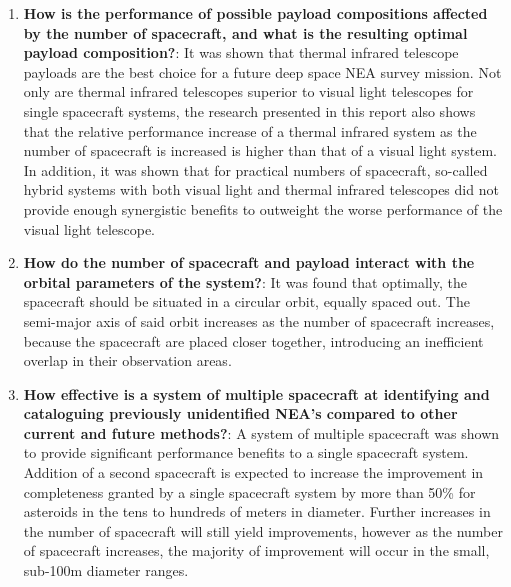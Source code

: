 \begin{enumerate}
 \item \textbf{How is the performance of possible payload compositions affected by the number of spacecraft, and what is the resulting optimal payload composition?}: It was shown that thermal infrared telescope payloads are the best choice for a future deep space NEA survey mission. Not only are thermal infrared telescopes superior to visual light telescopes for single spacecraft systems, the research presented in this report also shows that the relative performance increase of a thermal infrared system as the number of spacecraft is increased is higher than that of a visual light system. In addition, it was shown that for practical numbers of spacecraft, so-called hybrid systems with both visual light and thermal infrared telescopes did not provide enough synergistic benefits to outweight the worse performance of the visual light telescope.
 \item \textbf{How do the number of spacecraft and payload interact with the orbital parameters of the system?}: It was found that optimally, the spacecraft should be situated in a circular orbit, equally spaced out. The semi-major axis of said orbit increases as the number of spacecraft increases, because the spacecraft are placed closer together, introducing an inefficient overlap in their observation areas.
 \item \textbf{How effective is a system of multiple spacecraft at identifying and cataloguing previously unidentified NEA's compared to other current and future methods?}: A system of multiple spacecraft was shown to provide significant performance benefits to a single spacecraft system. Addition of a second spacecraft is expected to increase the improvement in completeness granted by a single spacecraft system by more than 50\% for asteroids in the tens to hundreds of meters in diameter. Further increases in the number of spacecraft will still yield improvements, however as the number of spacecraft increases, the majority of improvement will occur in the small, sub-100m diameter ranges.
\end{enumerate}

